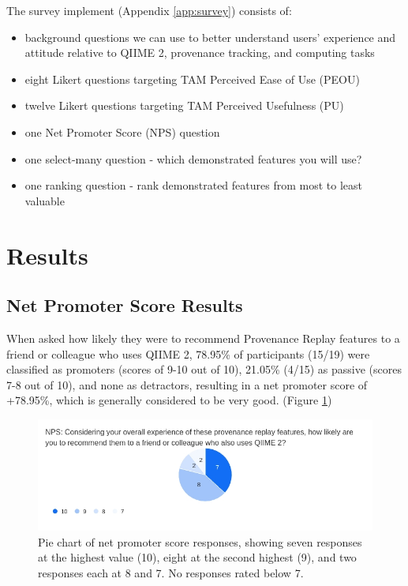 The survey implement (Appendix \ref{app:survey}) consists of:
\begin{itemize}
    \item background questions we can use to better understand users’ experience
        and attitude relative to QIIME 2, provenance tracking, and computing tasks
    \item eight Likert questions targeting TAM Perceived Ease of Use (PEOU)
    \item twelve Likert questions targeting TAM Perceived Usefulness (PU)
    \item one Net Promoter Score (NPS) question
    \item one select-many question - which demonstrated features you will use?
    \item one ranking question - rank demonstrated features from most to least valuable
\end{itemize}

\section{Results}

\subsection{Net Promoter Score Results}

When asked how likely they were to recommend Provenance Replay features to a
friend or colleague who uses QIIME 2, 78.95\% of participants (15/19) were
classified as promoters (scores of 9-10 out of 10), 21.05\% (4/15) as passive
(scores 7-8 out of 10), and none as detractors, resulting in a net promoter
score of +78.95\%, which is generally considered to be very good. (Figure \ref{fig:NPS})

\begin{figure}[htbp]
\centering
\includegraphics[width=\textwidth]{figures/NPS.jpg}
\caption[Pie chart of net promoter score responses]%
{Pie chart of net promoter score responses, showing seven responses at the
highest value (10), eight at the second highest (9), and two responses each at 8
and 7. No responses rated below 7.}
\label{fig:NPS}
\end{figure}

